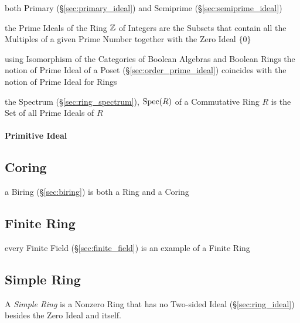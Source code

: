 both Primary (\S\ref{sec:primary_ideal}) and Semiprime
(\S\ref{sec:semiprime_ideal})

the Prime Ideals of the Ring $\mathbb{Z}$ of Integers are the Subsets that contain
all the Multiples of a given Prime Number together with the Zero Ideal $\{0\}$

\fist using Isomorphism of the Categories of Boolean Algebras and Boolean Rings
the notion of Prime Ideal of a Poset (\S\ref{sec:order_prime_ideal}) coincides
with the notion of Prime Ideal for Rings

the Spectrum (\S\ref{sec:ring_spectrum}), $\mathrm{Spec}(R)$ of a Commutative Ring $R$
is the Set of all Prime Ideals of $R$



\paragraph{Primitive Ideal}\label{sec:primitive_ideal}\hfill



\subsection{Coring}\label{sec:coring}

a Biring (\S\ref{sec:biring}) is both a Ring and a Coring



\subsection{Finite Ring}\label{sec:finite_ring}

every Finite Field (\S\ref{sec:finite_field}) is an example of a Finite Ring



\subsection{Simple Ring}\label{sec:simple_ring}

A \emph{Simple Ring} is a Nonzero Ring that has no Two-sided Ideal
(\S\ref{sec:ring_ideal}) besides the Zero Ideal and itself.

